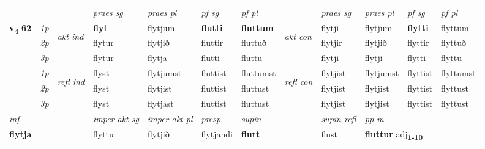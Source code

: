 \begin{longtable}[l]{X>{\footnotesize\itshape}llXXXXlXXXX}
 & &   & \textit{praes sg}  & \textit{praes pl}    & \textit{ pf sg} & \textit{pf pl} & & \textit{praes sg}  & \textit{praes pl}    & \textit{pf sg} & \textit{pf pl }  \\ \cmidrule{4-7} \cmidrule{9-12}
 \multirow{2}{*}{{{\textbf{v{\textsubscript{4}}} \Large{\textbf{62}}}}}  & 1p & \multirow{3}{*}{\begin{turn}{90}\textit{akt ind}\end{turn}} & \textbf{flyt} & flytjum & \textbf{flutti} & \textbf{fluttum} & \multirow{3}{*}{\begin{turn}{90}\textit{akt con}\end{turn}} &flytji & flytjum & \textbf{flytti} & flyttum\\*
 & 2p &  &  flytur  & flytjið & fluttir & fluttuð & & flytjir & flytjið & flyttir & flyttuð \\*
 & 3p &  & flytur & flytja & flutti & fluttu & & flytji & flytji& flytti & flyttu \\*
\cmidrule{4-7} \cmidrule{9-12}
 & 1p & \multirow{3}{*}{\begin{turn}{90}\textit{refl ind}\end{turn}}  & flyst & flytjumst & fluttist & fluttumst & \multirow{3}{*}{\begin{turn}{90}\textit{refl con}\end{turn}}  &flytjist & flytjumst & flyttist & flyttumst \\*
 & 2p &  & flyst & flytjist & fluttist & fluttust & &flytjist & flytjist & flyttist & flyttust \\*
 & 3p  & & flyst & flytjast & fluttist & fluttust & & flytjist & flytjist& flyttist & flyttust \\*
\cmidrule{4-7} \cmidrule{9-12}

   {\textit{inf}} & &  & \textit{imper akt sg} & \textit{imper akt pl}   & \textit{presp} & \textit{supin} && \textit{supin refl} & \textit{pp m} \\*
  {\textbf{flytja}} & && flyttu  & flytjið   & flytjandi &  \textbf{flutt} && flust & \multicolumn{2}{l}{\textbf{fluttur} adj\textbf{\textsubscript{1-10}}} \\*

\midrule


\end{longtable}
